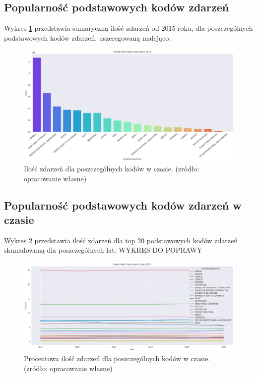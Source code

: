 \documentclass[11pt]{report}
\begin{document}
 \subsection{Popularność podstawowych kodów zdarzeń}
  	Wykres \ref{fig:GLOBALERC} przedstawia sumaryczną ilość zdarzeń od 2015 roku, dla poszczególnych podstawowych kodów zdarzeń, uszeregowaną malejąco.
  	  \begin{figure}[ht]
	\centering
	\includegraphics[width=0.8 \textwidth]{fig/GLOBAL/ERC.png}
	\caption{Ilość zdarzeń dla poszczególnych kodów w czasie. (zródło: opracowanie własne)}
	\label{fig:GLOBALERC}
	\end{figure}
	
 \subsection{Popularność podstawowych kodów zdarzeń w czasie}
  Wykres \ref{fig:GLOBALERCperc} przedstawia ilość zdarzeń dla top 20 podstawowych kodów zdarzeń skumulowaną dla poszczególnych lat.
   WYKRES DO POPRAWY
     \begin{figure}[ht]
	\centering
	\includegraphics[width=0.8 \textwidth]{fig/GLOBAL/ERCperc.png}
	\caption{Procentowa ilość zdarzeń dla poszczególnych kodów w czasie. (zródło: opracowanie własne)}
	\label{fig:GLOBALERCperc}
	\end{figure}
	
\end{document}
